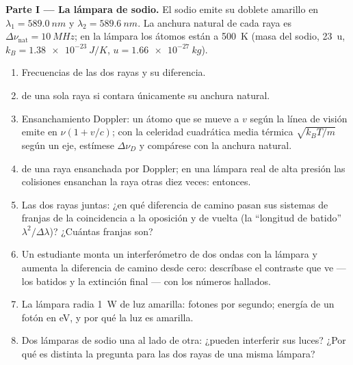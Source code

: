 \begin{problem}
\label{pb:b2:scalar-light-model:1}

\medskip
\noindent\textbf{Parte I --- La lámpara de sodio.}
El sodio emite su doblete amarillo en $\lambda_1 = \qty{589.0}{nm}$ y $\lambda_2 =
\qty{589.6}{nm}$. La anchura natural de cada raya es $\Delta\nu_{\text{nat}} =
\qty{10}{MHz}$; en la lámpara los átomos están a \qty{500}{K} (masa del sodio,
\qty{23}{u}, $k_B = \qty{1.38e-23}{J/K}$, $u = \qty{1.66e-27}{kg}$).
\begin{enumerate}
  \item Frecuencias de las dos rayas y su diferencia.
  \item {} de una sola raya si contara únicamente su anchura
        natural.
  \item Ensanchamiento Doppler: un átomo que se mueve a $v$ según la línea de
        visión emite en $\nu(1 + v/c)$; con la celeridad cuadrática media térmica $\sqrt{k_BT
        /m}$ según un eje, estímese $\Delta\nu_D$ y compárese con la
        anchura natural.
  \item {} de una raya ensanchada por Doppler; en una lámpara
        real de alta presión las colisiones ensanchan la raya otras diez
        veces:  entonces.
  \item Las dos rayas juntas: ¿en qué diferencia de camino pasan sus
        sistemas de franjas de la coincidencia a la oposición y de vuelta
        (la ``longitud de batido'' $\lambda^2/\Delta\lambda$)? ¿Cuántas franjas son?
  \item Un estudiante monta un interferómetro de dos ondas con la lámpara y
        aumenta la diferencia de camino desde cero: descríbase el
        contraste que ve --- los batidos y la extinción final --- con
        los números hallados.
  \item La lámpara radia \qty{1}{W} de luz amarilla: fotones por segundo;
        energía de un fotón en eV, y por qué la luz es amarilla.
  \item Dos lámparas de sodio una al lado de otra: ¿pueden interferir sus luces?
        ¿Por qué es distinta la pregunta para las dos rayas de una misma lámpara?
\end{enumerate}


\end{problem}
